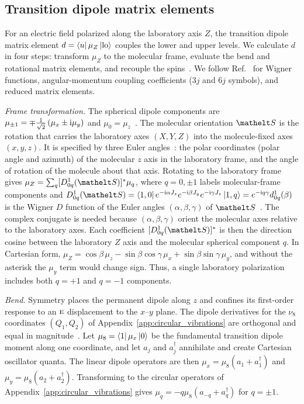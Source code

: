 \subsection{Transition dipole matrix elements}
\label{app:caoch3_dipoles}

For an electric field polarized along the laboratory axis $Z$, the transition dipole matrix element $d=\bra{u}\mu_Z\ket{\mathrm{lo}}$ couples the lower and upper levels. We calculate $d$ in four steps: transform $\mu_Z$ to the molecular frame, evaluate the bend and rotational matrix elements, and recouple the spins~\cite{Edmonds1957,Zare1988,BrownCarrington2003}. We follow Ref.~\cite{Edmonds1957} for Wigner functions, angular-momentum coupling coefficients ($3j$ and $6j$ symbols), and reduced matrix elements.

\emph{Frame transformation.} The spherical dipole components are $\mu_{\pm1}=\mp\tfrac{1}{\sqrt2}\,(\mu_x\pm\mathrm{i}\mu_y)$ and $\mu_0=\mu_z$~\cite{Zare1988,BrownCarrington2003}. The molecular orientation $\orient$ is the rotation that carries the laboratory axes $(X,Y,Z)$ into the molecule-fixed axes $(x,y,z)$. It is specified by three Euler angles~\cite{Zare1988}: the polar coordinates (polar angle and azimuth) of the molecular $z$ axis in the laboratory frame, and the angle of rotation of the molecule about that axis. Rotating to the laboratory frame gives $\mu_Z=\sum_q [\wignerD{1}_{0q}(\orient)]^*\mu_q$, where $q=0,\pm1$ labels molecular-frame components and $\wignerD{1}_{0q}(\orient)=\bra{1,0}e^{-\iunit\alpha J_z}e^{-\iunit\beta J_y}e^{-\iunit\gamma J_z}\ket{1,q}=e^{-\iunit q\gamma}d^{1}_{0q}(\beta)$ is the Wigner $D$ function of the Euler angles $(\alpha,\beta,\gamma)$ of $\orient$~\cite{Zare1988}. The complex conjugate is needed because $(\alpha,\beta,\gamma)$ orient the molecular axes relative to the laboratory axes. Each coefficient $[\wignerD{1}_{0q}(\orient)]^*$ is then the direction cosine between the laboratory $Z$ axis and the molecular spherical component $q$. In Cartesian form, $\mu_Z=\cos\beta\,\mu_z-\sin\beta\cos\gamma\,\mu_x+\sin\beta\sin\gamma\,\mu_y$, and without the asterisk the $\mu_y$ term would change sign. Thus, a single laboratory polarization includes both $q=+1$ and $q=-1$ components.

\emph{Bend.} Symmetry places the permanent dipole along $z$ and confines its first-order response to an $\text{\normalfont\scshape e}$ displacement to the $x$--$y$ plane. The dipole derivatives for the $\nu_8$ coordinates $(Q_1,Q_2)$ of Appendix~\ref{app:circular_vibrations} are orthogonal and equal in magnitude~\cite{Herzberg1945,BunkerJensen2006}. Let $\mu_8=\bra{1}\mu_x\ket{0}$ be the fundamental transition dipole moment along one coordinate, and let $a_j$ and $a_j^\dagger$ annihilate and create Cartesian oscillator quanta. The linear dipole operators are then $\mu_x=\mu_8(a_1+a_1^\dagger)$ and $\mu_y=\mu_8(a_2+a_2^\dagger)$. Transforming to the circular operators of Appendix~\ref{app:circular_vibrations} gives $\mu_q=-q\mu_8(a_{-q}+a_q^\dagger)$ for $q=\pm1$.

